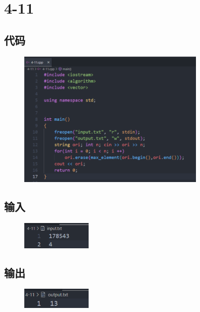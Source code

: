 \documentclass[11pt]{article}  %
\begin{document}
\section*{4-11}

\subsection*{代码}

    \begin{figure}[H]
        \centering
        \includegraphics[width = 0.8\textwidth]{pic/4-11.png}
    \end{figure}

\subsection*{输入}

    \begin{figure}[H]
        \centering
        \includegraphics[width = 0.3\textwidth]{pic/4-11in.png}
    \end{figure}

\subsection*{输出}

    \begin{figure}[H]
        \centering
        \includegraphics[width = 0.3\textwidth]{pic/4-11out.png}
    \end{figure}
    
\end{document}

